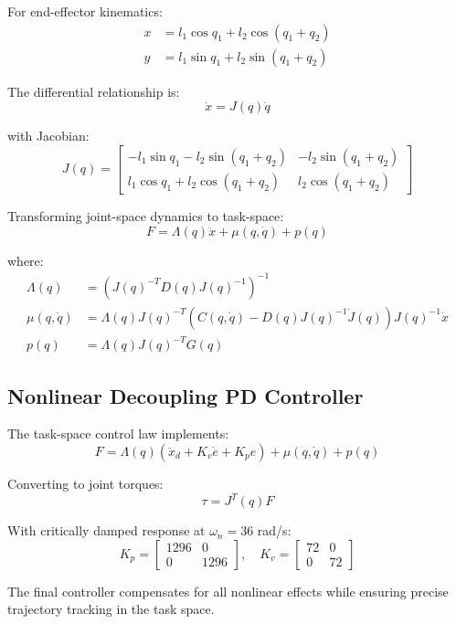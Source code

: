 \documentclass{article}
\begin{document}
For end-effector kinematics:
\begin{align}
x &= l_1 \cos q_1 + l_2 \cos(q_1 + q_2) \\
y &= l_1 \sin q_1 + l_2 \sin(q_1 + q_2)
\end{align}

The differential relationship is:
\[
\dot{x} = J(q) \dot{q}
\]

with Jacobian:
\[
J(q) = \begin{bmatrix} 
-l_1 \sin q_1 - l_2 \sin(q_1 + q_2) & -l_2 \sin(q_1 + q_2) \\ 
l_1 \cos q_1 + l_2 \cos(q_1 + q_2) & l_2 \cos(q_1 + q_2) 
\end{bmatrix}
\]

Transforming joint-space dynamics to task-space:
\[
F = \Lambda(q) \ddot{x} + \mu(q, \dot{q}) + p(q)
\]

where:
\begin{align}
\Lambda(q) &= (J(q)^{-T} D(q) J(q)^{-1})^{-1} \\
\mu(q, \dot{q}) &= \Lambda(q) J(q)^{-T} \left(C(q, \dot{q}) - D(q) J(q)^{-1} \dot{J}(q)\right) J(q)^{-1} \dot{x} \\
p(q) &= \Lambda(q) J(q)^{-T} G(q)
\end{align}

\subsection*{Nonlinear Decoupling PD Controller}

The task-space control law implements:
\[
F = \Lambda(q) (\ddot{x}_d + K_v \dot{e} + K_p e) + \mu(q, \dot{q}) + p(q)
\]

Converting to joint torques:
\[
\tau = J^{T}(q) F
\]

With critically damped response at $\omega_n = 36$ rad/s:
\[
K_p = \begin{bmatrix} 1296 & 0 \\ 0 & 1296 \end{bmatrix}, \quad 
K_v = \begin{bmatrix} 72 & 0 \\ 0 & 72 \end{bmatrix}
\]

The final controller compensates for all nonlinear effects while ensuring precise trajectory tracking in the task space.
\end{document}
